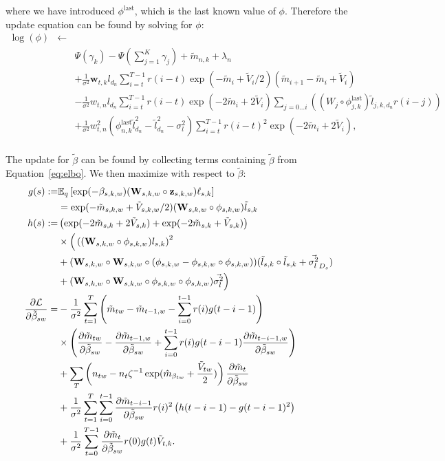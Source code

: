 \documentclass{article}
\newcommand{\mv}{\tilde{m}}
\newcommand{\z}{\bold{z}}
\newcommand{\vv}[0]{\tilde{V}}
\newcommand{\W}{\textbf{W}}
\newcommand{\w}{\textbf{w}}
\newcommand{\bv}{\tilde{\beta}}
\newcommand{\bb}{\beta}
\newcommand{\lv}{\tilde{l}}
\newcommand{\vlv}{{\sigma^2_{l}}}
\newcommand{\expectq}[1]{\mathbb{E}_q\left[#1\right]}
\newcommand{\partl}[2]{\frac{\partial #1}{\partial #2}}
\begin{document}
where we have introduced $\phi^{\mbox{last}}$, which is the last known value of
$\phi$.  Therefore the update equation can be found by solving for $\phi$:
\begin{eqnarray}
\log(\phi) & \gets & \\
 & & \Psi(\gamma_k) - \Psi(\sum_{j=1}^K \gamma_j) + \mv_{n,k} + \lambda_n \\
& &  + \frac{1}{\sigma^2} \w_{t,k} l_{d_n} \sum_{i=t}^{T-1} r(i-t) \exp(-\mv_i + \vv_i / 2) (\mv_{i + 1} - \mv_i + \vv_i) \\
& & - \frac{1}{\sigma^2} w_{t,n} l_{d_n} \sum_{i=t}^{T-1} r(i-t) \exp(-2\mv_i + 2 \vv_i) \sum_{j=0\ldots i} \left( (W_{j} \circ \phi_{j,k}^{\mbox{last}}) \lv_{j,k,d_n} r(i-j) \right) \\
& & + \frac{1} {\sigma^2} w_{t,n}^2 (\phi_{n,k}^{\mbox{last}} \lv_{d_n}^2 - \lv_{d_n}^2 - \sigma_l^2) \sum_{i=t}^{T-1} r(i-t)^2 \exp(-2\mv_i + 2 \vv_i), \\
\end{eqnarray}

The update for $\bv$ can be found by collecting terms containing $\bv$
from Equation~\ref{eq:elbo}.  We then maximize with respect to $\bv$:
\begin{align*}
%
%
g(s) := & \expectq{\exp(-\beta_{s,k,w} ) ( \W_{s,k,w} \circ \z_{s,k,w} ) \ell_{s,k} } \\
        & = \exp(-\mv_{s,k,w} + \vv_{s,k,w} / 2) ( \W_{s,k,w} \circ \phi_{s,k,w} ) \lv_{s,k} \\
h(s) := & \left( \exp(-2 \mv_{s,k} + 2 \vv_{s,k}) + \exp(-2 \mv_{s,k} + \vv_{s,k}) \right) \\
       & \times \Big( \left( (\W_{s,k,w} \circ \phi_{s,k,w}) l_{s,k} \right)^2 \\
       & + ( \W_{s,k,w} \circ \W_{s,k,w} \circ ( \phi_{s,k,w} - \phi_{s,k,w} \circ \phi_{s,k,w} ) ) (\lv_{s,k} \circ \lv_{s,k} + \vec{\vlv}_{D_{s}}) \notag \\
       & + ( \W_{s,k,w} \circ \W_{s,k,w} \circ \phi_{s,k,w} \circ \phi_{s,k,w} ) \vec{\vlv} \Big)\notag \\
\partl{\mathcal{L}}{\bv_{sw}} =
   & - \frac{1}{\sigma^2} \sum_{t=1}^T
     \left( \mv_{tw} - \mv_{t-1,w} - \sum_{i=0}^{t-1} r(i) g(t-i-1) \right) \\
    &  \times \left( \partl{\mv_{tw}}{\bv_{sw}}
     - \partl{\mv_{t-1,w}}{\bv_{sw}}
     + \sum_{i=0}^{t-1} r(i) g(t-i-1) \partl{\mv_{t-i-1,w}}{\bv_{sw}} \right) \\
   & + \sum_T \left(
       n_{tw} - n_{t} \zeta^{-1}
       \exp( \hat{m}_{\bb_{tw}} + \frac{\tilde{V}_{tw}}{2} ) \right)
       \partl{\mv_t}{\bv_{sw}} \\
   & + \frac{1}{\sigma^2} \sum_{t=1}^T
         \sum_{i=0}^{t-1} \partl{\mv_{t-i-1}}{\bv_{sw}}
         r(i)^2 \left( h(t-i-1) - g(t-i-1)^2 \right) \\
   & + \frac{1}{\sigma^2} \sum_{t=0}^{T-1}
         \partl{\mv_{t}}{\bv_{sw}}
         r(0) g(t) \vv_{t,k}.
\end{align*}
\end{document}
